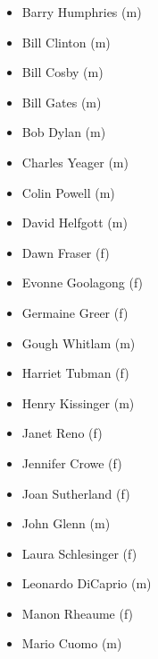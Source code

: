 \documentclass[
]{book}
\providecommand{\tightlist}{%
  \setlength{\itemsep}{0pt}\setlength{\parskip}{0pt}}
\begin{document}
\begin{itemize}
\tightlist
\item
  Barry Humphries (m)\\
\item
  Bill Clinton (m)\\
\item
  Bill Cosby (m)\\
\item
  Bill Gates (m)\\
\item
  Bob Dylan (m)\\
\item
  Charles Yeager (m)\\
\item
  Colin Powell (m)\\
\item
  David Helfgott (m)\\
\item
  Dawn Fraser (f)\\
\item
  Evonne Goolagong (f)\\
\item
  Germaine Greer (f)
\end{itemize}

\begin{itemize}
\tightlist
\item
  Gough Whitlam (m)\\
\item
  Harriet Tubman (f)\\
\item
  Henry Kissinger (m)\\
\item
  Janet Reno (f)\\
\item
  Jennifer Crowe (f)\\
\item
  Joan Sutherland (f)\\
\item
  John Glenn (m)\\
\item
  Laura Schlesinger (f)\\
\item
  Leonardo DiCaprio (m)\\
\item
  Manon Rheaume (f)\\
\item
  Mario Cuomo (m)
\end{itemize}
\end{document}
